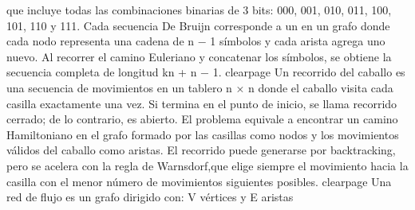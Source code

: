 {}que incluye todas las combinaciones binarias de 3 bits: 000, 001, 010, 011, 100, 101, 110 y 111.\markdownRendererParagraphSeparator
{}Cada secuencia De Bruijn corresponde a un  en un grafo donde cada nodo representa una cadena de \markdownRendererDollarSign{}n − 1\markdownRendererDollarSign{} símbolos y cada arista agrega uno nuevo.\markdownRendererHardLineBreak
{}Al recorrer el camino Euleriano y concatenar los símbolos, se obtiene la secuencia completa de longitud \markdownRendererDollarSign{}k\markdownRendererCircumflex{}n + n − 1\markdownRendererDollarSign{}.\markdownRendererInterblockSeparator
{}\markdownRendererInterblockSeparator
{}\markdownRendererDollarSign{}\markdownRendererBackslash{}clearpage\markdownRendererDollarSign{}\markdownRendererInterblockSeparator
{}
\markdownRendererSectionEnd \markdownRendererSectionBegin
{}\markdownRendererInterblockSeparator
{}Un recorrido del caballo es una secuencia de movimientos en un tablero \markdownRendererDollarSign{}n × n\markdownRendererDollarSign{} donde el caballo visita cada casilla exactamente una vez.\markdownRendererSoftLineBreak
{}Si termina en el punto de inicio, se llama recorrido cerrado; de lo contrario, es abierto.\markdownRendererSoftLineBreak
{}El problema equivale a encontrar un camino Hamiltoniano en el grafo formado por las casillas como nodos y los movimientos válidos del caballo como aristas.\markdownRendererParagraphSeparator
{}El recorrido puede generarse por backtracking, pero se acelera con la regla de Warnsdorf,que elige siempre el movimiento hacia la casilla con el menor número de movimientos siguientes posibles.\markdownRendererInterblockSeparator
{}\markdownRendererInterblockSeparator
{}\markdownRendererDollarSign{}\markdownRendererBackslash{}clearpage\markdownRendererDollarSign{}\markdownRendererParagraphSeparator
{}
\markdownRendererSectionEnd 
\markdownRendererSectionEnd 
\markdownRendererSectionEnd \markdownRendererSectionBegin
{}\markdownRendererInterblockSeparator
{}\markdownRendererSectionBegin
{}\markdownRendererInterblockSeparator
{}Una red de flujo es un grafo dirigido con:\markdownRendererInterblockSeparator
{}\markdownRendererUlBeginTight
\markdownRendererUlItem V vértices y E aristas\markdownRendererUlItemEnd 
